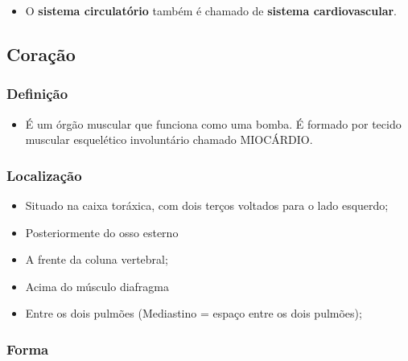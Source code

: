 \documentclass[
]{book}
\providecommand{\tightlist}{%
  \setlength{\itemsep}{0pt}\setlength{\parskip}{0pt}}
\begin{document}
\begin{itemize}
\tightlist
\item
  O \textbf{sistema circulatório} também é chamado de \textbf{sistema cardiovascular}.
\end{itemize}

\hypertarget{corauxe7uxe3o}{%
\subsection{Coração}\label{corauxe7uxe3o}}

\hypertarget{definiuxe7uxe3o-2}{%
\subsubsection{Definição}\label{definiuxe7uxe3o-2}}

\begin{itemize}
\tightlist
\item
  É um órgão muscular que funciona como uma bomba. É formado por tecido muscular esquelético involuntário chamado MIOCÁRDIO.
\end{itemize}

\hypertarget{localizauxe7uxe3o}{%
\subsubsection{Localização}\label{localizauxe7uxe3o}}

\begin{itemize}
\tightlist
\item
  Situado na caixa toráxica, com dois terços voltados para o lado esquerdo;
\item
  Posteriormente do osso esterno
\item
  A frente da coluna vertebral;
\item
  Acima do músculo diafragma
\item
  Entre os dois pulmões (Mediastino = espaço entre os dois pulmões);
\end{itemize}

\hypertarget{forma}{%
\subsubsection{Forma}\label{forma}}
\end{document}

